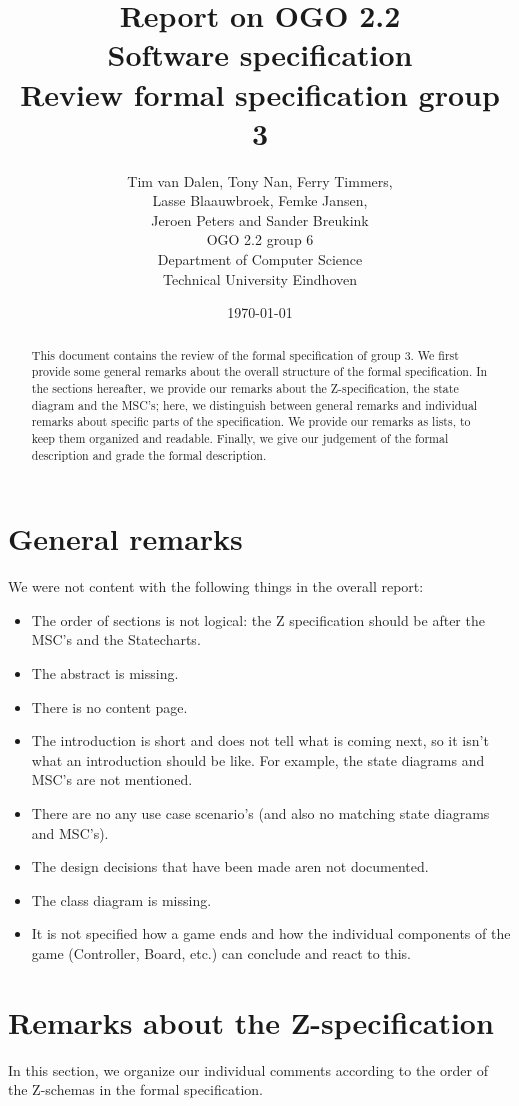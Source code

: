 \documentclass[a4paper,11pt]{article}
\title{Report on OGO 2.2 \\ Software specification\\ Review formal specification group 3}
\author{
        Tim van Dalen, Tony Nan, Ferry Timmers, \\ Lasse Blaauwbroek, Femke Jansen, \\Jeroen Peters and Sander Breukink\\ OGO 2.2 group 6 \\
                Department of Computer Science\\
        Technical University Eindhoven\\
}
\date{\today}
\begin{document}
\maketitle

\begin{abstract}
This document contains the review of the formal specification of group 3. We first provide some general remarks about the overall structure of the formal specification. In the sections hereafter, we provide our remarks about the Z-specification, the state diagram and the MSC's; here, we distinguish between general remarks and individual remarks about specific parts of the specification. We provide our remarks as lists, to keep them organized and readable. Finally, we give our judgement of the formal description and grade the formal description.
\end{abstract}

\newpage
	
	\tableofcontents
	\newpage
	
	\section{General remarks}
    We were not content with the following things in the overall report:
    \begin{itemize}
        \item The order of sections is not logical: the Z specification should be after the MSC's and the Statecharts.
        \item The abstract is missing.
        \item There is no content page.
        \item The introduction is short and does not tell what is coming next, so it isn't what an introduction should be like. For example, the state diagrams and MSC's are not mentioned.
        \item There are no any use case scenario's (and also no matching state diagrams and MSC's).
        \item The design decisions that have been made aren not documented.
        \item The class diagram is missing.
        \item It is not specified how a game ends and how the individual components of the game (Controller, Board, etc.) can conclude and react to this.
    \end{itemize}
	
	\section{Remarks about the Z-specification}
    In this section, we organize our individual comments according to the order of the Z-schemas in the formal specification.
\end{document}
